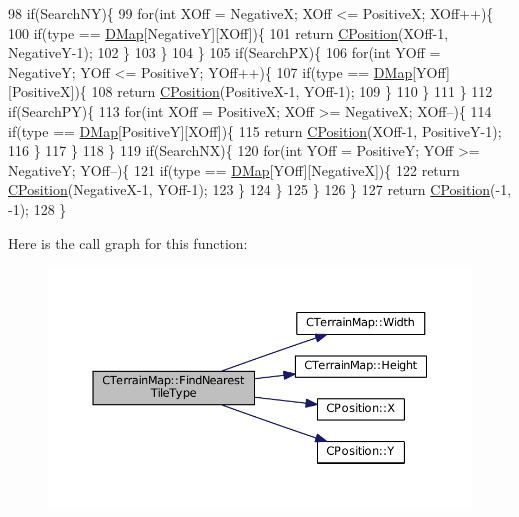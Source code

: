 \begin{DoxyCode}
98         \textcolor{keywordflow}{if}(SearchNY)\{
99             \textcolor{keywordflow}{for}(\textcolor{keywordtype}{int} XOff = NegativeX; XOff <= PositiveX; XOff++)\{
100                 \textcolor{keywordflow}{if}(type == \hyperlink{classCTerrainMap_a80d154ce478948b10473534a7bca13f6}{DMap}[NegativeY][XOff])\{
101                     \textcolor{keywordflow}{return} \hyperlink{classCPosition}{CPosition}(XOff-1, NegativeY-1);
102                 \}
103             \}
104         \}
105         \textcolor{keywordflow}{if}(SearchPX)\{
106             \textcolor{keywordflow}{for}(\textcolor{keywordtype}{int} YOff = NegativeY; YOff <= PositiveY; YOff++)\{
107                 \textcolor{keywordflow}{if}(type == \hyperlink{classCTerrainMap_a80d154ce478948b10473534a7bca13f6}{DMap}[YOff][PositiveX])\{
108                     \textcolor{keywordflow}{return} \hyperlink{classCPosition}{CPosition}(PositiveX-1, YOff-1);
109                 \}
110             \}
111         \}
112         \textcolor{keywordflow}{if}(SearchPY)\{
113             \textcolor{keywordflow}{for}(\textcolor{keywordtype}{int} XOff = PositiveX; XOff >= NegativeX; XOff--)\{
114                 \textcolor{keywordflow}{if}(type == \hyperlink{classCTerrainMap_a80d154ce478948b10473534a7bca13f6}{DMap}[PositiveY][XOff])\{
115                     \textcolor{keywordflow}{return} \hyperlink{classCPosition}{CPosition}(XOff-1, PositiveY-1);
116                 \}
117             \}
118         \}
119         \textcolor{keywordflow}{if}(SearchNX)\{
120             \textcolor{keywordflow}{for}(\textcolor{keywordtype}{int} YOff = PositiveY; YOff >= NegativeY; YOff--)\{
121                 \textcolor{keywordflow}{if}(type == \hyperlink{classCTerrainMap_a80d154ce478948b10473534a7bca13f6}{DMap}[YOff][NegativeX])\{
122                     \textcolor{keywordflow}{return} \hyperlink{classCPosition}{CPosition}(NegativeX-1, YOff-1);
123                 \}
124             \}
125         \}
126     \}
127     \textcolor{keywordflow}{return} \hyperlink{classCPosition}{CPosition}(-1, -1);
128 \}
\end{DoxyCode}
Here is the call graph for this function\+:\nopagebreak
\begin{figure}[H]
\begin{center}
\leavevmode
\includegraphics[width=350pt]{classCTerrainMap_af32811cace3a3b01c9519b304ddb8efc_cgraph}
\end{center}
\end{figure}
